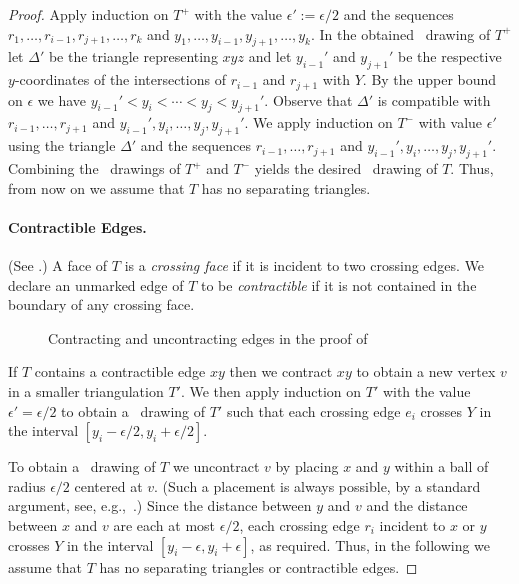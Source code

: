 \begin{proof}
Apply induction on $T^+$ with the value $\epsilon':=\epsilon/2$ and the sequences $r_1,\ldots,r_{i-1},r_{j+1},\ldots,r_k$ and
	$y_1,\ldots,y_{i-1},y_{j+1},\ldots,y_k$. In the obtained \Fary\ drawing of $T^+$ let $\Delta'$ be the triangle representing  $xyz$ and let $y_{i-1}'$ and $y_{j+1}'$
	be the respective $y$-coordinates of the intersections of
	$r_{i-1}$ and $r_{j+1}$ with $Y$.  By the upper bound on
	$\epsilon$ we have $y_{i-1}'<y_i<\cdots<y_j<y_{j+1}'$.  Observe that
	$\Delta'$ is compatible with $r_{i-1},\ldots,r_{j+1}$ and
	$y_{i-1}',y_i,\ldots,y_j,y_{j+1}'$.
	We apply induction on $T^-$ with value $\epsilon'$ using the triangle $\Delta'$ and the sequences $r_{i-1},\ldots,r_{j+1}$ and
	$y_{i-1}',y_i,\ldots,y_{j},y_{j+1}'$.  Combining the \Fary\ drawings of $T^+$
	and $T^-$ yields the desired \Fary\ drawing of $T$.  Thus,
        from now on we assume that $T$ has no separating triangles.
	
	\paragraph{Contractible Edges.}
	(See .)
	A face of $T$ is a \emph{crossing
		face} if it is incident to two crossing edges. We declare an
	unmarked edge of $T$ to be \emph{contractible} if it is not contained
	in the boundary of any crossing face.  
	\begin{figure}[htb]
		\caption{Contracting and uncontracting edges in the proof of
			}
	\end{figure}
	
	If $T$ contains a contractible edge $xy$ then we contract $xy$ to
	obtain a new vertex $v$ in a smaller triangulation $T'$.   We then apply
	induction on $T'$ with the value $\epsilon'=\epsilon/2$ to obtain a \Fary\
	drawing of $T'$ such that each crossing edge $e_i$ crosses
	$Y$ in the interval $[y_i-\epsilon/2,y_i+\epsilon/2]$.
	
	To obtain a \Fary\ drawing of $T$ we uncontract $v$ by placing $x$ and $y$
	within a ball of radius $\epsilon/2$ centered at $v$. (Such
	a placement is always possible, by a standard argument, see, e.g.,~\cite{fary,w-sp-05}.)  Since the
	distance between $y$ and $v$ and the distance between $x$ and $v$ are each at most $\epsilon/2$,
	each crossing edge $r_i$ incident to $x$ or $y$ crosses $Y$ in the interval $[y_i-\epsilon,y_i+\epsilon]$, as required.
	Thus, in the following we assume that $T$ has no separating triangles or contractible
	edges.
	

\end{proof}
